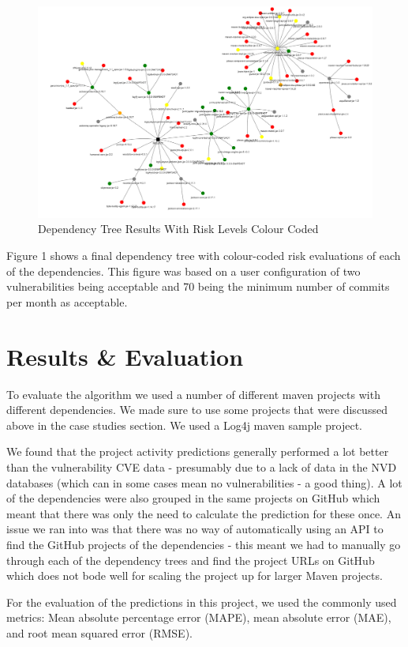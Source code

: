 \documentclass[10pt, compsoc, conference]{IEEEtran}
\begin{document}
\begin{figure}
    \centering
    \includegraphics[width=1\linewidth]{image.png}
    \caption{Dependency Tree Results With Risk Levels Colour Coded} 
\end{figure}

Figure 1 shows a final dependency tree with colour-coded risk evaluations of each of the dependencies. This figure was based on a user configuration of two vulnerabilities being acceptable and 70 being the minimum number of commits per month as acceptable. 


\section{Results \& Evaluation}
To evaluate the algorithm we used a number of different maven projects with different dependencies. We made sure to use some projects that were discussed above in the case studies section. We used a Log4j maven sample project. 

We found that the project activity predictions generally performed a lot better than the vulnerability CVE data - presumably due to a lack of data in the NVD databases (which can in some cases mean no vulnerabilities - a good thing). A lot of the dependencies were also grouped in the same projects on GitHub which meant that there was only the need to calculate the prediction for these once. An issue we ran into was that there was no way of automatically using an API to find the GitHub projects of the dependencies - this meant we had to manually go through each of the dependency trees and find the project URLs on GitHub which does not bode well for scaling the project up for larger Maven projects. 

For the evaluation of the predictions in this project, we used the commonly used metrics: Mean absolute percentage error (MAPE), mean absolute error (MAE), and root mean squared error (RMSE). 
\end{document}

